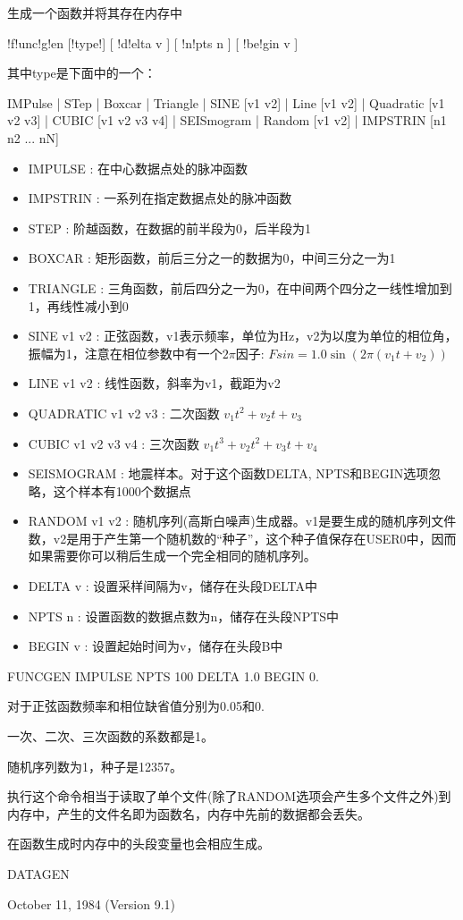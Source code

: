 \label{cmd:funcgen}

生成一个函数并将其存在内存中

\begin{SACSyntax}
!f!unc!g!en [!type!] [ !d!elta v ] [ !n!pts n ] [ !be!gin v ]
\end{SACSyntax}

其中type是下面中的一个：

IMPulse | STep | Boxcar | Triangle | SINE [v1 v2] | Line [v1 v2] |
Quadratic [v1 v2 v3] | CUBIC [v1 v2 v3 v4] | SEISmogram | Random [v1 v2]
| IMPSTRIN  [n1 n2 ... nN]

\begin{itemize}
\item IMPULSE : 在中心数据点处的脉冲函数 
\item IMPSTRIN : 一系列在指定数据点处的脉冲函数  
\item STEP :  阶越函数，在数据的前半段为0，后半段为1 
\item BOXCAR : 矩形函数，前后三分之一的数据为0，中间三分之一为1 
\item TRIANGLE : 三角函数，前后四分之一为0，在中间两个四分之一线性增加到1，再线性减小到0 
\item SINE v1 v2 : 正弦函数，v1表示频率，单位为Hz，v2为以度为单位的相位角，振幅为1，注意在相位参数中有一个$2\pi$因子: $ Fsin = 1.0 \sin (2\pi (v_1t+v_2))$ 
\item LINE v1 v2 : 线性函数，斜率为v1，截距为v2 
\item QUADRATIC v1 v2 v3 : 二次函数 $v_1 t^{2} + v_2 t + v_3 $
\item CUBIC v1 v2 v3 v4 : 三次函数 $ v_1 t^{3} + v_2 t^2 + v_3t + v_4 $
\item SEISMOGRAM : 地震样本。对于这个函数DELTA, NPTS和BEGIN选项忽略，这个样本有1000个数据点 
\item RANDOM v1 v2 :  随机序列(高斯白噪声)生成器。v1是要生成的随机序列文件数，v2是用于产生第一个随机数的``种子''，这个种子值保存在USER0中，因而如果需要你可以稍后生成一个完全相同的随机序列。 
\item DELTA v : 设置采样间隔为v，储存在头段DELTA中 
\item NPTS n : 设置函数的数据点数为n，储存在头段NPTS中 
\item BEGIN v : 设置起始时间为v，储存在头段B中 
\end{itemize}

FUNCGEN IMPULSE NPTS 100 DELTA 1.0 BEGIN 0.

对于正弦函数频率和相位缺省值分别为0.05和0.

一次、二次、三次函数的系数都是1。

随机序列数为1，种子是12357。

执行这个命令相当于读取了单个文件(除了RANDOM选项会产生多个文件之外)到内存中，产生的文件名即为函数名，内存中先前的数据都会丢失。

在函数生成时内存中的头段变量也会相应生成。

DATAGEN

October 11, 1984 (Version 9.1)
